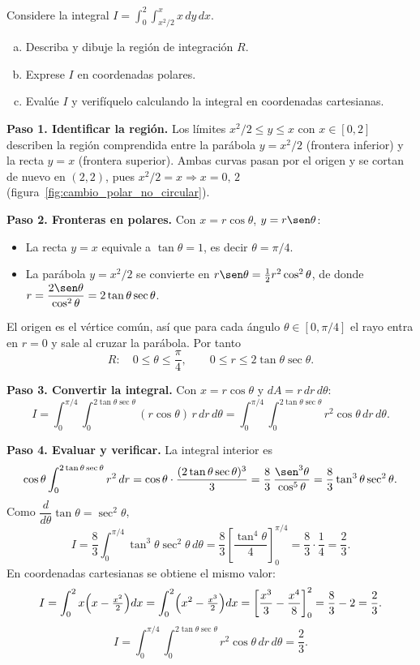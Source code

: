 \begin{prob}
Considere la integral $\displaystyle I=\int_0^2\int_{x^2/2}^{x} x\,dy\,dx$.
\begin{enumerate}[a)]
  \item Describa y dibuje la región de integración $R$.
  \item Exprese $I$ en coordenadas polares.
  \item Evalúe $I$ y verifíquelo calculando la integral en coordenadas
        cartesianas.
\end{enumerate}
\begin{myproof}
\textbf{Paso 1. Identificar la región.} Los límites $x^2/2\le y\le x$ con
$x\in[0,2]$ describen la región comprendida entre la parábola $y=x^2/2$
(frontera inferior) y la recta $y=x$ (frontera superior). Ambas curvas pasan
por el origen y se cortan de nuevo en $(2,2)$, pues $x^2/2=x\Rightarrow
x=0,\,2$ (figura~\ref{fig:cambio_polar_no_circular}).

\textbf{Paso 2. Fronteras en polares.} Con $x=r\cos\theta$, $y=r\sen\theta$:
\begin{itemize}
  \item La recta $y=x$ equivale a $\tan\theta=1$, es decir $\theta=\pi/4$.
  \item La parábola $y=x^2/2$ se convierte en
        $r\sen\theta=\tfrac{1}{2}r^2\cos^2\theta$, de donde
        $r=\dfrac{2\sen\theta}{\cos^2\theta}=2\tan\theta\sec\theta$.
\end{itemize}
El origen es el vértice común, así que para cada ángulo $\theta\in[0,\pi/4]$
el rayo entra en $r=0$ y sale al cruzar la parábola. Por tanto
\[
  R:\quad 0\le\theta\le\frac{\pi}{4},\qquad
          0\le r\le 2\tan\theta\sec\theta.
\]

\textbf{Paso 3. Convertir la integral.} Con $x=r\cos\theta$ y
$dA=r\,dr\,d\theta$:
\[
  I=\int_0^{\pi/4}\!\!\int_0^{2\tan\theta\sec\theta}
    (r\cos\theta)\,r\,dr\,d\theta
   =\int_0^{\pi/4}\!\!\int_0^{2\tan\theta\sec\theta}
    r^2\cos\theta\,dr\,d\theta.
\]

\textbf{Paso 4. Evaluar y verificar.} La integral interior es
\[
  \cos\theta\int_0^{2\tan\theta\sec\theta} r^2\,dr
  =\cos\theta\cdot\frac{(2\tan\theta\sec\theta)^3}{3}
  =\frac{8}{3}\,\frac{\sen^3\theta}{\cos^5\theta}
  =\frac{8}{3}\tan^3\theta\sec^2\theta.
\]
Como $\dfrac{d}{d\theta}\tan\theta=\sec^2\theta$,
\[
  I=\frac{8}{3}\int_0^{\pi/4}\tan^3\theta\sec^2\theta\,d\theta
   =\frac{8}{3}\left[\frac{\tan^4\theta}{4}\right]_0^{\pi/4}
   =\frac{8}{3}\cdot\frac14=\frac23.
\]
En coordenadas cartesianas se obtiene el mismo valor:
\[
  I=\int_0^2 x\Bigl(x-\tfrac{x^2}{2}\Bigr)dx
   =\int_0^2\Bigl(x^2-\tfrac{x^3}{2}\Bigr)dx
   =\left[\frac{x^3}{3}-\frac{x^4}{8}\right]_0^2
   =\frac83-2=\frac23.
\]
\[
  \boxed{\,I=\int_0^{\pi/4}\!\!\int_0^{2\tan\theta\sec\theta}
    r^2\cos\theta\,dr\,d\theta=\frac23.\,}
\]
\end{myproof}
\end{prob}

